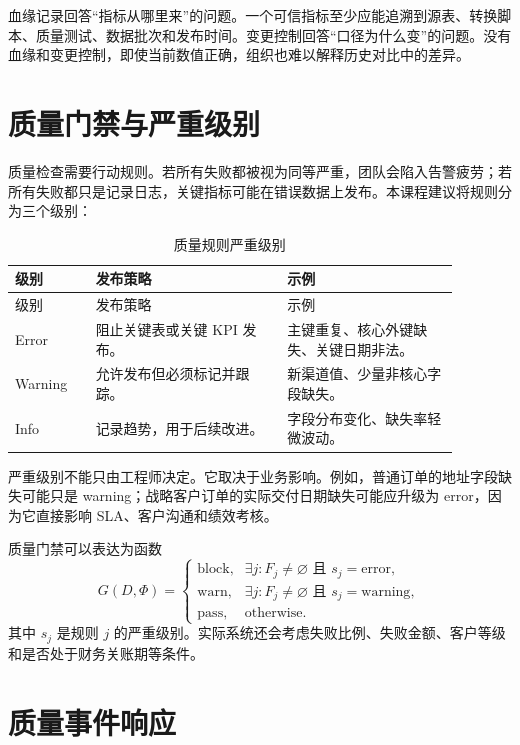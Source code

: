 \documentclass[UTF8,fontset=fandol,openany,zihao=-4]{ctexbook}
\begin{document}
血缘记录回答“指标从哪里来”的问题。一个可信指标至少应能追溯到源表、转换脚本、质量测试、数据批次和发布时间。变更控制回答“口径为什么变”的问题。没有血缘和变更控制，即使当前数值正确，组织也难以解释历史对比中的差异。

\section{质量门禁与严重级别}

质量检查需要行动规则。若所有失败都被视为同等严重，团队会陷入告警疲劳；若所有失败都只是记录日志，关键指标可能在错误数据上发布。本课程建议将规则分为三个级别：

\begin{longtable}{>{\raggedright\arraybackslash}p{0.16\linewidth}>{\raggedright\arraybackslash}p{0.38\linewidth}>{\raggedright\arraybackslash}p{0.34\linewidth}}
\caption{质量规则严重级别}\\
\toprule
级别 & 发布策略 & 示例\\
\midrule
\endfirsthead
\toprule
级别 & 发布策略 & 示例\\
\midrule
\endhead
Error & 阻止关键表或关键 KPI 发布。 & 主键重复、核心外键缺失、关键日期非法。\\
Warning & 允许发布但必须标记并跟踪。 & 新渠道值、少量非核心字段缺失。\\
Info & 记录趋势，用于后续改进。 & 字段分布变化、缺失率轻微波动。\\
\bottomrule
\end{longtable}

严重级别不能只由工程师决定。它取决于业务影响。例如，普通订单的地址字段缺失可能只是 warning；战略客户订单的实际交付日期缺失可能应升级为 error，因为它直接影响 SLA、客户沟通和绩效考核。

质量门禁可以表达为函数
\[
G(D,\Phi)=
\begin{cases}
\text{block}, & \exists j: F_j\ne \varnothing \text{ 且 } s_j=\text{error},\\
\text{warn}, & \exists j: F_j\ne \varnothing \text{ 且 } s_j=\text{warning},\\
\text{pass}, & \text{otherwise}.
\end{cases}
\]
其中 \(s_j\) 是规则 \(j\) 的严重级别。实际系统还会考虑失败比例、失败金额、客户等级和是否处于财务关账期等条件。

\section{质量事件响应}
\end{document}

